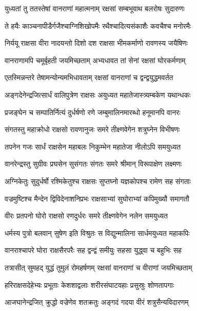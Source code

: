 
\twolineshloka
{युध्यतां तु ततस्तेषां वानराणां महात्मनाम्}
{रक्षसां सम्बभूवाथ बलरोषः सुदारुणः} %

\twolineshloka
{ते हयैः काञ्चनापीडैर्गजैश्चाग्निशिखोपमैः}
{रथैश्चादित्यसंकाशैः कवचैश्च मनोरमैः} %

\twolineshloka
{निर्ययू राक्षसा वीरा नादयन्तो दिशो दश}
{राक्षसा भीमकर्माणो रावणस्य जयैषिणः} %

\twolineshloka
{वानराणामपि चमूर्बृहती जयमिच्छताम्}
{अभ्यधावत तां सेनां रक्षसां घोरकर्मणाम्} %

\twolineshloka
{एतस्मिन्नन्तरे तेषामन्योन्यमभिधावताम्}
{रक्षसां वानराणां च द्वन्द्वयुद्धमवर्तत} %

\twolineshloka
{अङ्गदेनेन्द्रजित्सार्धं वालिपुत्रेण राक्षसः}
{अयुध्यत महातेजास्त्र्यम्बकेण यथान्धकः} %

\twolineshloka
{प्रजङ्घेन च सम्पातिर्नित्यं दुर्धर्षणो रणे}
{जम्बुमालिनमारब्धो हनूमानपि वानरः} %

\twolineshloka
{संगतस्तु महाक्रोधो राक्षसो रावणानुजः}
{समरे तीक्ष्णवेगेन शत्रुघ्नेन विभीषणः} %

\twolineshloka
{तपनेन गजः सार्धं राक्षसेन महाबलः}
{निकुम्भेन महातेजा नीलोऽपि समयुध्यत} %

\twolineshloka
{वानरेन्द्रस्तु सुग्रीवः प्रघसेन सुसंगतः}
{संगतः समरे श्रीमान् विरूपाक्षेण लक्ष्मणः} %

\twolineshloka
{अग्निकेतुः सुदुर्धर्षो रश्मिकेतुश्च राक्षसः}
{सुप्तघ्नो यज्ञकोपश्च रामेण सह संगताः} %

\twolineshloka
{वज्रमुष्टिश्च मैन्देन द्विविदेनाशनिप्रभः}
{राक्षसाभ्यां सुघोराभ्यां कपिमुख्यौ समागतौ} %

\twolineshloka
{वीरः प्रतपनो घोरो राक्षसो रणदुर्धरः}
{समरे तीक्ष्णवेगेन नलेन समयुध्यत} %

\twolineshloka
{धर्मस्य पुत्रो बलवान् सुषेण इति विश्रुतः}
{स विद्युन्मालिना सार्धमयुध्यत महाकपिः} %

\twolineshloka
{वानराश्चापरे घोरा राक्षसैरपरैः सह}
{द्वन्द्वं समीयुः सहसा युद्ध्वा च बहुभिः सह} %

\twolineshloka
{तत्रासीत् सुमहद् युद्धं तुमुलं रोमहर्षणम्}
{रक्षसां वानराणां च वीराणां जयमिच्छताम्} %

\twolineshloka
{हरिराक्षसदेहेभ्यः प्रभूताः केशशाद्वलाः}
{शरीरसंघाटवहाः प्रसुस्रुः शोणतापगाः} %

\twolineshloka
{आजघानेन्द्रजित् क्रुद्धो वज्रेणेव शतक्रतुः}
{अङ्गदं गदया वीरं शत्रुसैन्यविदारणम्} %


